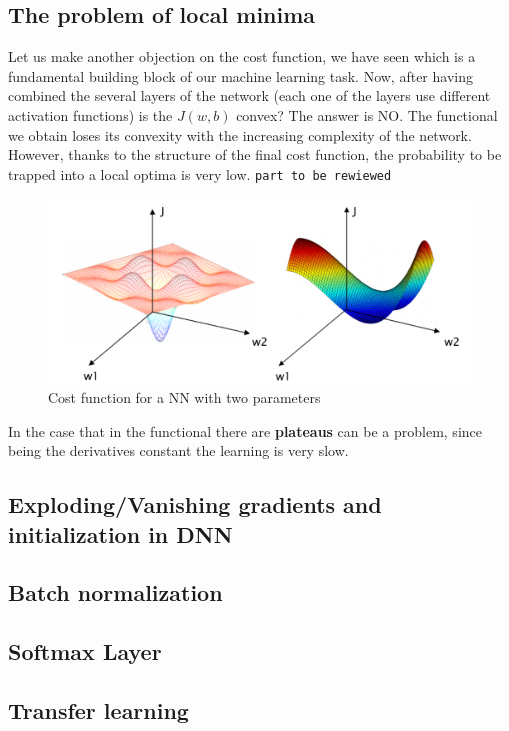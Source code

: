\subsection{The problem of local minima}
Let us make another objection on the cost function, we have seen which is a fundamental building block of our machine learning task. Now, after having combined the several layers of the network (each one of the layers use different activation functions) is the $J(w,b)$ convex? The answer is NO. The functional we obtain loses its convexity with the increasing complexity of the network. However, thanks to the structure of the final cost function, the probability to be trapped into a local optima is very low. \texttt{part to be rewiewed}

\begin{figure}[h]
    \centering
    \includegraphics[scale=0.6]{img/Jnocvx.png}
    \caption{Cost function for a NN with two parameters}
\end{figure}
In the case that in the functional there are \textbf{plateaus} can be a problem, since being the derivatives constant the learning is very slow.

\subsection{Exploding/Vanishing gradients and initialization in DNN}

\subsection{Batch normalization}

\subsection{Softmax Layer}

\subsection{Transfer learning}
